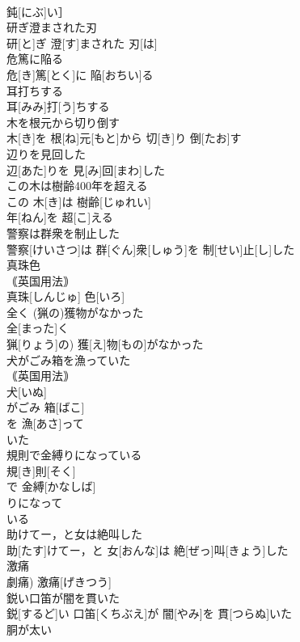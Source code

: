 \documentclass[8pt]{extreport}
\begin{document}
\begin{CJK}{UTF8}{min}
\\	鈍[にぶ]い］
\\	研ぎ澄まされた刃	
\\	研[と]ぎ 澄[す]まされた 刃[は]
\\	危篤に陥る	
\\	危[き]篤[とく]に 陥[おちい]る
\\	耳打ちする	
\\	耳[みみ]打[う]ちする
\\	木を根元から切り倒す	
\\	木[き]を 根[ね]元[もと]から 切[き]り 倒[たお]す
\\	辺りを見回した	
\\	辺[あた]りを 見[み]回[まわ]した
\\	この木は樹齢400年を超える	
\\	この 木[き]は 樹齢[じゅれい] 
\\	年[ねん]を 超[こ]える
\\	警察は群衆を制止した	
\\	警察[けいさつ]は 群[ぐん]衆[しゅう]を 制[せい]止[し]した
\\	真珠色	
\\	｟英国用法｠ 
\\	真珠[しんじゅ] 色[いろ]
\\	全く (猟の)獲物がなかった	
\\	全[まった]く
\\	猟[りょう]の) 獲[え]物[もの]がなかった
\\	犬がごみ箱を漁っていた	
\\	｟英国用法｠ 
\\	犬[いぬ]
\\	がごみ 箱[ばこ]
\\	を 漁[あさ]って 
\\	いた
\\	規則で金縛りになっている	
\\	規[き]則[そく]
\\	で 金縛[かなしば]
\\	りになって 
\\	いる 
\\	助けてー，と女は絶叫した	
\\	助[たす]けてー，と 女[おんな]は 絶[ぜっ]叫[きょう]した
\\	激痛	
\\	劇痛)	激痛[げきつう]
\\	鋭い口笛が闇を貫いた	
\\	鋭[するど]い 口笛[くちぶえ]が 闇[やみ]を 貫[つらぬ]いた
\\	胴が太い	

\end{CJK}
\end{document}
